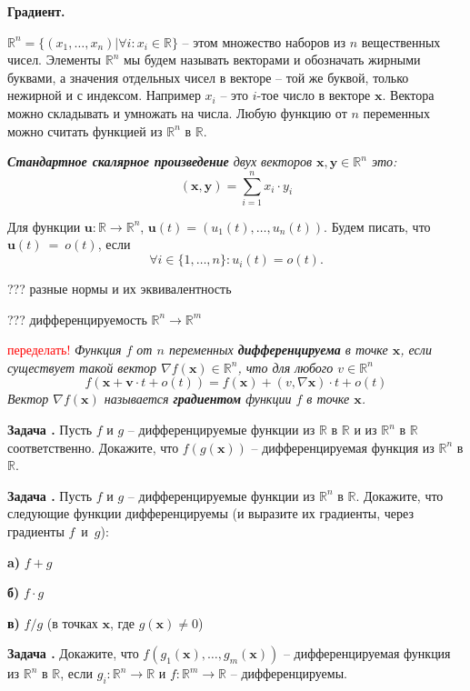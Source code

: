 \documentclass[12pt,a4paper]{article}
\def\R{\mathbb{R}}
\newcounter{znum}
\newcommand{\z}[1]{\addtocounter{znum}{1} \textbf{Задача \arabic{znum}#1. }}
\begin{document}
\pagestyle{empty}

\begin{center} \Large \textbf{Градиент.}
\end{center}

$\R^n = \{(x_1,\ldots, x_n)| \forall i : x_i \in \R \}$ -- этом множество наборов из $n$ вещественных чисел. Элементы $\R^n$ мы будем называть векторами и обозначать жирными буквами, а значения отдельных чисел в векторе -- той же буквой, только нежирной и с индексом. Например $x_i$ -- это $i$-тое число в векторе $\mathbf{x}$. Вектора можно складывать и умножать на числа. Любую функцию от $n$ переменных можно считать функцией из $\R^n$ в $\R$. 


{\it \textbf{Стандартное скалярное произведение} двух векторов $\mathbf{x}, \mathbf{y} \in \R^n$ это:
$$ (\mathbf{x}, \mathbf{y}) = \sum_{i = 1}^n x_i \cdot y_i$$
}

Для функции $\mathbf{u} : \R \to \R^n$, $\mathbf{u}(t) = (u_1(t), \ldots, u_n(t))$. Будем писать, что $\mathbf{u}(t)~=~o(t)$, если
$$\forall i \in \{1,\ldots, n\} : u_i(t) = o(t). $$

??? разные нормы и их эквивалентность

??? дифференцируемость $\R^n \to \R^m$

\textcolor{red}{переделать!}
{\it Функция $f$ от $n$ переменных \textbf{дифференцируема} в точке $\mathbf{x}$, если существует такой вектор $\nabla f(\mathbf{x}) \in \R^n$, что для любого $v \in \R^n$
$$ f(\mathbf{x} + \mathbf{v} \cdot t + o(t)) = f(\mathbf{x}) + (v, \nabla \mathbf{x}) \cdot t + o(t)$$
Вектор $\nabla f(\mathbf{x})$ называется \textbf{градиентом} функции $f$ в точке $\mathbf{x}$.
}

\z{} Пусть $f$ и $g$ -- дифференцируемые функции из $\R$ в $\R$ и из $\R^n$ в $\R$ соответственно. Докажите, что $f(g(\mathbf{x}))$ -- дифференцируемая функция из $\R^n$  в $\R$.

\z{} Пусть $f$ и $g$ -- дифференцируемые функции из $\R^n$ в $\R$. Докажите, что следующие функции дифференцируемы (и выразите их градиенты, через градиенты $f$~и~$g$):\par
\textbf{a)} $f + g$ \par
\textbf{б)} $f \cdot g$ \par
\textbf{в)} $f / g$ (в точках $\mathbf{x}$, где $g(\mathbf{x}) \ne 0$)

\z{} Докажите, что $f(g_1(\mathbf{x}), \ldots, g_m(\mathbf{x}))$ -- дифференцируемая функция из $\R^n$ в $\R$, если $g_i: \R^n \to \R$ и $f: \R^m \to \R$ -- дифференцируемы.
\end{document}
